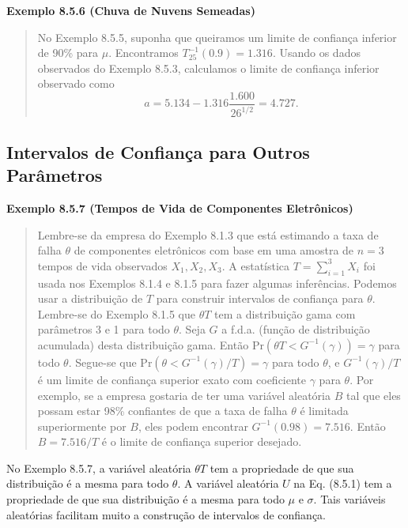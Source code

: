 \noindent\textbf{Exemplo 8.5.6 (Chuva de Nuvens Semeadas)}
\begin{quote}
    No Exemplo 8.5.5, suponha que queiramos um limite de confiança inferior de 90\% para $\mu$. Encontramos $T_{25}^{-1}(0.9) = 1.316$. Usando os dados observados do Exemplo 8.5.3, calculamos o limite de confiança inferior observado como
    $$
    a = 5.134 - 1.316 \frac{1.600}{26^{1/2}} = 4.727.
    $$
\end{quote}
\vspace{1em}

\subsection*{Intervalos de Confiança para Outros Parâmetros}

\vspace{1em}
\noindent\textbf{Exemplo 8.5.7 (Tempos de Vida de Componentes Eletrônicos)}
\begin{quote}
    Lembre-se da empresa do Exemplo 8.1.3 que está estimando a taxa de falha $\theta$ de componentes eletrônicos com base em uma amostra de $n=3$ tempos de vida observados $X_1, X_2, X_3$. A estatística $T = \sum_{i=1}^3 X_i$ foi usada nos Exemplos 8.1.4 e 8.1.5 para fazer algumas inferências. Podemos usar a distribuição de $T$ para construir intervalos de confiança para $\theta$. Lembre-se do Exemplo 8.1.5 que $\theta T$ tem a distribuição gama com parâmetros 3 e 1 para todo $\theta$. Seja $G$ a f.d.a. (função de distribuição acumulada) desta distribuição gama. Então $\text{Pr}(\theta T < G^{-1}(\gamma)) = \gamma$ para todo $\theta$. Segue-se que $\text{Pr}(\theta < G^{-1}(\gamma)/T) = \gamma$ para todo $\theta$, e $G^{-1}(\gamma)/T$ é um limite de confiança superior exato com coeficiente $\gamma$ para $\theta$. Por exemplo, se a empresa gostaria de ter uma variável aleatória $B$ tal que eles possam estar 98\% confiantes de que a taxa de falha $\theta$ é limitada superiormente por $B$, eles podem encontrar $G^{-1}(0.98) = 7.516$. Então $B = 7.516/T$ é o limite de confiança superior desejado.
\end{quote}
\vspace{1em}

No Exemplo 8.5.7, a variável aleatória $\theta T$ tem a propriedade de que sua distribuição é a mesma para todo $\theta$. A variável aleatória $U$ na Eq. (8.5.1) tem a propriedade de que sua distribuição é a mesma para todo $\mu$ e $\sigma$. Tais variáveis aleatórias facilitam muito a construção de intervalos de confiança.

